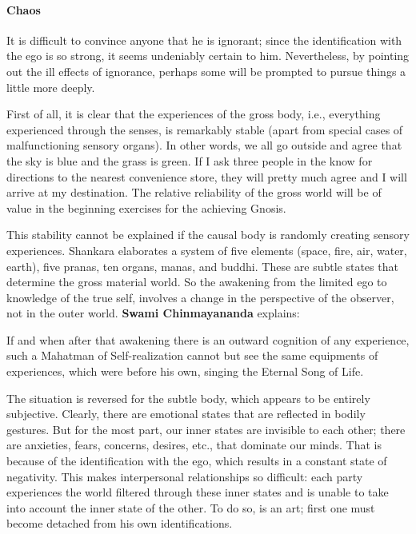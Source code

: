 \paragraph{Chaos}


It is difficult to convince anyone that he is ignorant; since the identification with the ego is so strong, it seems undeniably certain to him. Nevertheless, by pointing out the ill effects of ignorance, perhaps some will be prompted to pursue things a little more deeply.

First of all, it is clear that the experiences of the gross body, i.e., everything experienced through the senses, is remarkably stable (apart from special cases of malfunctioning sensory organs). In other words, we all go outside and agree that the sky is blue and the grass is green. If I ask three people in the know for directions to the nearest convenience store, they will pretty much agree and I will arrive at my destination. The relative reliability of the gross world will be of value in the beginning exercises for the achieving Gnosis.

This stability cannot be explained if the causal body is randomly creating sensory experiences. Shankara elaborates a system of five elements (space, fire, air, water, earth), five pranas, ten organs, manas, and buddhi. These are subtle states that determine the gross material world. So the awakening from the limited ego to knowledge of the true self, involves a change in the perspective of the observer, not in the outer world. \textbf{Swami Chinmayananda} explains:

\begin{quotex}
If and when after that awakening there is an outward cognition of any experience, such a Mahatman of Self-realization cannot but see the same equipments of experiences, which were before his own, singing the Eternal Song of Life.
\end{quotex}


The situation is reversed for the subtle body, which appears to be entirely subjective. Clearly, there are emotional states that are reflected in bodily gestures. But for the most part, our inner states are invisible to each other; there are anxieties, fears, concerns, desires, etc., that dominate our minds. That is because of the identification with the ego, which results in a constant state of negativity. This makes interpersonal relationships so difficult: each party experiences the world filtered through these inner states and is unable to take into account the inner state of the other. To do so, is an art; first one must become detached from his own identifications.

